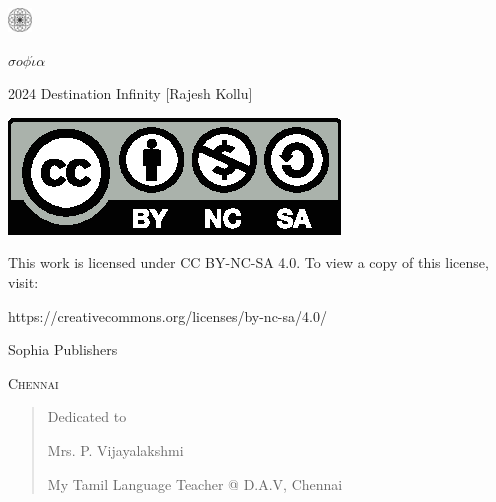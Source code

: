 \begin{center}
\HUGE{\thetitle}
\end{center}
\cleardoublepage

\begin{center}
\HUGE{\thetitle}
\end{center}

\begin{center}
\LARGE{\theauthor}
\end{center}

\vfill

\begin{center}
    \includegraphics[width=18pt]{logo.pdf}

    $\sigma o \phi \acute{\iota} \alpha$
\end{center}
\clearpage

\begingroup
\footnotesize
\setlength{\parindent}{0pt}
\setlength{\parskip}{\baselineskip}

\textcopyright{} 2024 Destination Infinity [Rajesh Kollu]

\includegraphics{by-nc-sa.eps}

This work is licensed under CC BY-NC-SA 4.0. To view a copy of this license,
visit:

https://creativecommons.org/licenses/by-nc-sa/4.0/

\endgroup

\vfill

{\footnotesize
Sophia Publishers

\textsc{Chennai}
}

\clearpage

\begin{quote}
\begin{center}Dedicated to

\Large
Mrs. P. Vijayalakshmi
\normalsize

My Tamil Language Teacher @ D.A.V, Chennai
\end{center}
\end{quote}

